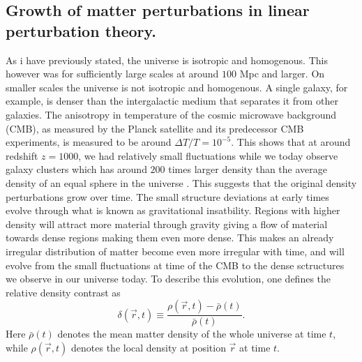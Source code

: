 \subsection{Growth of matter perturbations in linear perturbation theory.}\label{sec:linpert}
As i have previously stated, the universe is isotropic and homogenous. This
however was for sufficiently large scales at around $100$ Mpc and larger. On
smaller scales the universe is not isotropic and homogenous. A single galaxy,
for example, is denser than the intergalactic medium that separates it from other
galaxies. The anisotropy in temperature of the cosmic microwave background (CMB), as measured by
the Planck satellite and its predecessor CMB experiments, is measured to be
around $\Delta T/T=10^{-5}$. This shows that at around redshift $z=1000$, we had
relatively small fluctuations while we today observe galaxy clusters which has around
$200$ times larger density than the average density of an equal sphere in the
universe \cite[p.~342]{schneider2006extragalactic}. This suggests that the original density
perturbations grow over time. The small structure deviations at early times evolve through what is known as gravitational insatbility.
Regions with higher density will attract more material through gravity giving a flow of material towards dense regions making them even more dense.
This makes an already irregular distribution of matter become even more irregular with time, and will evolve from the small fluctuations at time of the CMB
to the dense sctructures we observe in our universe today.
To describe this evolution, one defines the relative density
contrast as
\begin{equation}
    \delta(\vec{r}, t) \equiv \frac{\rho(\vec{r}, t) - \bar{\rho}(t)}{\bar{\rho}(t)}.
\end{equation}
Here $\bar{\rho}(t)$ denotes the mean matter density of the whole universe at
time $t$, while $\rho(\vec{r}, t)$ denotes the local density at position
$\vec{r}$ at time $t$.\\

